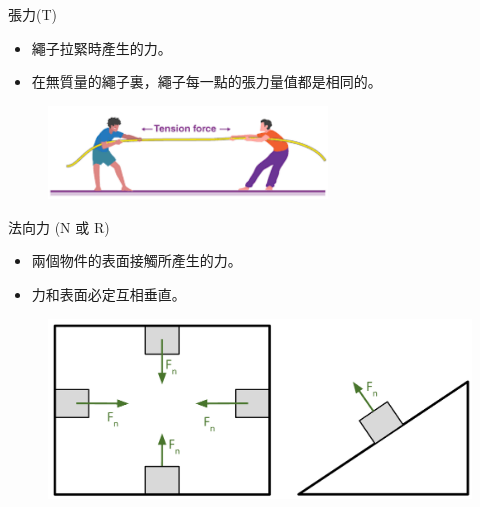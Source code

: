 \documentclass[beamer=true]{standalone}
\begin{document}
\begin{frame}{張力(T)}
    \begin{itemize}
        \item 繩子拉緊時產生的力。
        \item 在無質量的繩子裏，繩子每一點的張力量值都是相同的。
    \end{itemize}
    \begin{figure}[h!]
        \centering
        \includegraphics[width=0.66\textwidth]{assets/5673f702.png}
    \end{figure}
\end{frame}

\begin{frame}{法向力 (N 或 R) }
    \begin{itemize}
        \item 兩個物件的表面接觸所產生的力。
        \item 力和表面必定互相垂直。
    \end{itemize}
    \begin{figure}[h!]
        \centering
        \includegraphics[width=.8\textwidth]{assets/77585bbc.png}
    \end{figure}
\end{frame}
\end{document}
